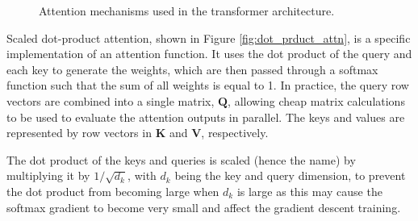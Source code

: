 \begin{figure}[htbp]
	\centering
	\quad\quad
	\caption{Attention mechanisms used in the transformer architecture.}
	\label{fig:multihead}
\end{figure}

Scaled dot-product attention, shown in Figure \ref{fig:dot_prduct_attn}, is a specific implementation of an attention function. 
It uses the dot product of the query and each key to generate the weights, which are then passed through a softmax function such that the sum of all weights is equal to 1.
In practice, the query row vectors are combined into a single matrix, $\boldsymbol{Q}$, allowing cheap matrix calculations to be used to evaluate the attention outputs in parallel.
The keys and values are represented by row vectors in $\boldsymbol{K}$ and $\boldsymbol{V}$, respectively.

The dot product of the keys and queries is scaled (hence the name) by multiplying it by $1 / \sqrt{d_k}$, with $d_k$ being the key and query dimension, to prevent the dot product from becoming large when $d_k$ is large as this may cause the softmax gradient to become very small and affect the gradient descent training.

